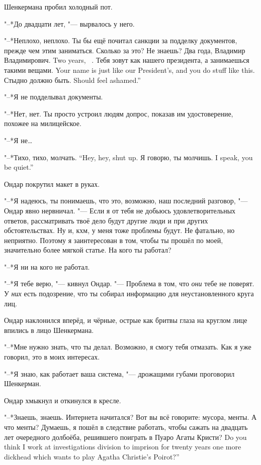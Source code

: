 Шенкермана пробил холодный пот.

"--*До двадцати лет, "--- вырвалось у него.

"--*Неплохо, неплохо.
Ты бы ещё почитал санкции за подделку документов, прежде чем этим заниматься.
Сколько за это?
Не знаешь?
{Два года, Владимир Владимирович.}
{Two years, \Vladimir\ \Vladimirovich.}
{Тебя зовут как нашего президента, а занимаешься такими вещами.}
{Your name is just like our President's, and you do stuff like this.}
{Стыдно должно быть.}
{Should feel ashamed.''}

"--*Я не подделывал документы.

"--*Нет, нет.
Ты просто устроил людям допрос, показав им удостоверение, похожее на милицейское.

"--*Я не\ldots{}

{"--*Тихо, тихо, молчать.}
{``Hey, hey, shut up.}
{Я говорю, ты молчишь.}
{I speak, you be quiet.''}

Ондар покрутил макет в руках.

"--*Я надеюсь, ты понимаешь, что это, возможно, наш последний разговор, "--- Ондар явно нервничал.
"--- Если я от тебя не добьюсь удовлетворительных ответов, рассматривать твоё дело будут другие люди и при других обстоятельствах.
Ну и, кхм, у меня тоже проблемы будут.
Не фатально, но неприятно.
Поэтому я заинтересован в том, чтобы ты прошёл по моей, значительно более мягкой статье.
На кого ты работал?

"--*Я ни на кого не работал.

"--*Я тебе верю, "--- кивнул Ондар.
"--- Проблема в том, что \emph{они} тебе не поверят.
У \emph{них} есть подозрение, что ты собирал информацию для неустановленного круга лиц.

Ондар наклонился вперёд, и чёрные, острые как бритвы глаза на круглом лице впились в лицо Шенкермана.

"--*Мне нужно знать, что ты делал.
Возможно, я смогу тебя отмазать.
Как я уже говорил, это в моих интересах.

"--*Я знаю, как работает ваша система, "--- дрожащими губами проговорил Шенкерман.

Ондар хмыкнул и откинулся в кресле.

"--*Знаешь, знаешь.
Интернета начитался?
Вот вы всё говорите: мусора, менты.
А что менты?
{Думаешь, я пошёл в следствие работать, чтобы сажать на двадцать лет очередного долбоёба, решившего поиграть в Пуаро Агаты Кристи?}
{Do you think I work at investigations division to imprison for twenty years one more dickhead which wants to play Agatha Christie's Poirot?''}

